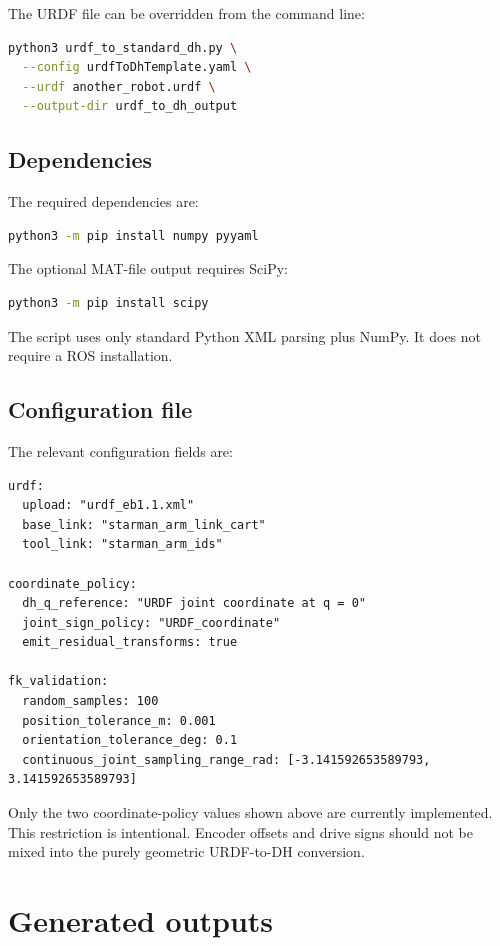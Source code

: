 \documentclass[11pt,a4paper]{article}
\begin{document}
The URDF file can be overridden from the command line:
\begin{lstlisting}[language=bash]
python3 urdf_to_standard_dh.py \
  --config urdfToDhTemplate.yaml \
  --urdf another_robot.urdf \
  --output-dir urdf_to_dh_output
\end{lstlisting}

\subsection{Dependencies}

The required dependencies are:
\begin{lstlisting}[language=bash]
python3 -m pip install numpy pyyaml
\end{lstlisting}

The optional MAT-file output requires SciPy:
\begin{lstlisting}[language=bash]
python3 -m pip install scipy
\end{lstlisting}

The script uses only standard Python XML parsing plus NumPy. It does not require a ROS installation.

\subsection{Configuration file}

The relevant configuration fields are:
\begin{lstlisting}[language={}]
urdf:
  upload: "urdf_eb1.1.xml"
  base_link: "starman_arm_link_cart"
  tool_link: "starman_arm_ids"

coordinate_policy:
  dh_q_reference: "URDF joint coordinate at q = 0"
  joint_sign_policy: "URDF_coordinate"
  emit_residual_transforms: true

fk_validation:
  random_samples: 100
  position_tolerance_m: 0.001
  orientation_tolerance_deg: 0.1
  continuous_joint_sampling_range_rad: [-3.141592653589793, 3.141592653589793]
\end{lstlisting}

Only the two coordinate-policy values shown above are currently implemented. This restriction is intentional. Encoder offsets and drive signs should not be mixed into the purely geometric URDF-to-DH conversion.

\section{Generated outputs}
\end{document}
